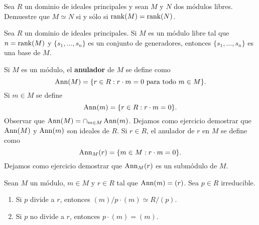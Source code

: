 \begin{exercise}
Sea $R$ un dominio de ideales principales 
y sean $M$ y $N$ dos módulos libres. Demuestre que $M\simeq N$ si y sólo si $\operatorname{rank}(M)=\operatorname{rank}(N)$. 	
\end{exercise}

\begin{exercise}
\label{xca:base}
Sea $R$ un dominio de ideales principales. 
Si $M$ es un módulo libre tal que $n=\operatorname{rank}(M)$ y $\{s_1,\dots,s_n\}$ es un conjunto de generadores, entonces $\{s_1,\dots,s_n\}$ es una base de $M$.
\end{exercise}

Si $M$ es un módulo, el \textbf{anulador} de $M$ se define como
\[
\operatorname{Ann}(M)=\{r\in R:r\cdot m=0\text{ para todo $m\in M$}\}.
\] 
Si $m\in M$ se define 
\[
\operatorname{Ann}(m)=\{r\in R:r\cdot m=0\}.
\]  
Observar que $\operatorname{Ann}(M)=\cap_{m\in M}\operatorname{Ann}(m)$. 
Dejamos como ejercicio demostrar que $\operatorname{Ann}(M)$ y $\operatorname{Ann}(m)$ son ideales de $R$. 
Si $r\in R$, el anulador de $r$ en $M$ se define como
\[
\operatorname{Ann}_M(r)=\{m\in M:r\cdot m=0\}.
\] 
Dejamos como ejercicio demostrar que $\operatorname{Ann}_M(r)$ es un submódulo de $M$. 

\begin{exercise}
Sean $M$ un módulo, $m\in M$ y $r\in R$ tal que $\operatorname{Ann}(m)=(r)$. Sea 
$p\in R$ irreducible. 
\begin{enumerate}
\item Si $p$ divide a $r$, entonces $(m)/p\cdot (m)\simeq R/(p)$.
\item Si $p$ no divide a $r$, entonces $p\cdot (m)=(m)$.
\end{enumerate}
\end{exercise}



